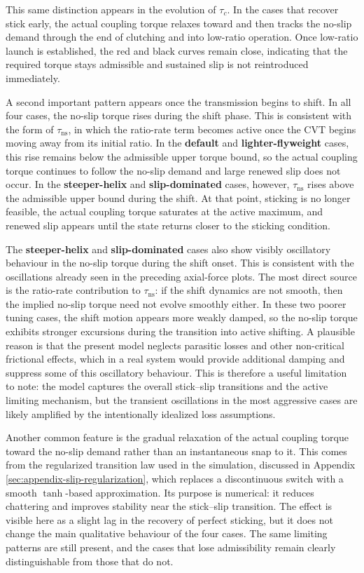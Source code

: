 \documentclass[11pt]{article}
\numberwithin{equation}{section}
\newcounter{assump}
\begin{document}
This same distinction appears in the evolution of \(\tau_c\). In the cases that
recover stick early, the actual coupling torque relaxes toward and then tracks
the no-slip demand through the end of clutching and into low-ratio operation.
Once low-ratio launch is established, the red and black curves remain close,
indicating that the required torque stays admissible and sustained slip is not
reintroduced immediately.

A second important pattern appears once the transmission begins to shift. In
all four cases, the no-slip torque rises during the shift phase. This is
consistent with the form of \(\tau_{\mathrm{ns}}\), in which the ratio-rate term
becomes active once the CVT begins moving away from its initial ratio. In the
\textbf{default} and \textbf{lighter-flyweight} cases, this rise remains below
the admissible upper torque bound, so the actual coupling torque continues to
follow the no-slip demand and large renewed slip does not occur. In the
\textbf{steeper-helix} and \textbf{slip-dominated} cases, however,
\(\tau_{\mathrm{ns}}\) rises above the admissible upper bound during the shift.
At that point, sticking is no longer feasible, the actual coupling torque
saturates at the active maximum, and renewed slip appears until the state
returns closer to the sticking condition.

The \textbf{steeper-helix} and \textbf{slip-dominated} cases also show visibly oscillatory
behaviour in the no-slip torque during the shift onset. This is consistent with
the oscillations already seen in the preceding axial-force plots. The most
direct source is the ratio-rate contribution to \(\tau_{\mathrm{ns}}\): if the
shift dynamics are not smooth, then the implied no-slip torque need not evolve
smoothly either. In these two poorer tuning cases, the shift motion appears
more weakly damped, so the no-slip torque exhibits stronger excursions during
the transition into active shifting. A plausible reason is that the present
model neglects parasitic losses and other non-critical frictional effects,
which in a real system would provide additional damping and suppress some of
this oscillatory behaviour. This is therefore a useful limitation to note: the
model captures the overall stick--slip transitions and the active limiting
mechanism, but the transient oscillations in the most aggressive cases are
likely amplified by the intentionally idealized loss assumptions.

Another common feature is the gradual relaxation of the actual coupling torque
toward the no-slip demand rather than an instantaneous snap to it. This comes
from the regularized transition law used in the simulation, discussed in
Appendix \ref{sec:appendix-slip-regularization}, which replaces a discontinuous switch with a smooth \(\tanh\)-based
approximation. Its purpose is numerical: it reduces chattering and improves
stability near the stick--slip transition. The effect is visible here as a
slight lag in the recovery of perfect sticking, but it does not change the main
qualitative behaviour of the four cases. The same limiting patterns are still
present, and the cases that lose admissibility remain clearly distinguishable
from those that do not.
\end{document}
